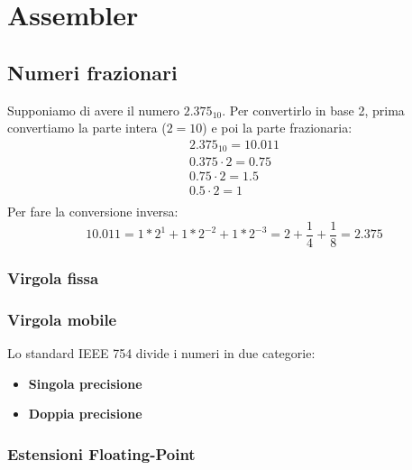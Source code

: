 \section{Assembler}
\subsection{Numeri frazionari}
Supponiamo di avere il numero $2.375_{10}$. Per convertirlo in base 2, prima convertiamo la parte intera ($2=10$) e poi la parte frazionaria:
\begin{equation*}
	\begin{split}
		2.375_{10} = 10.011 \\
		0.375 \cdot 2 = 0.75 \\
		0.75 \cdot 2 = 1.5 \\
		0.5 \cdot 2 = 1 \\
	\end{split}
\end{equation*}
Per fare la conversione inversa:
\begin{equation*}
	10.011 = 1*2^1 + 1 * 2^{-2} + 1 * 2^{-3}=2+\frac{1}{4} + \frac{1}{8} = 2.375
\end{equation*}
\subsubsection{Virgola fissa}
\subsubsection{Virgola mobile}
Lo standard IEEE 754 divide i numeri in due categorie:
\begin{itemize}
	\item \textbf{Singola precisione}
	\item \textbf{Doppia precisione}
\end{itemize}

\subsubsection{Estensioni Floating-Point}
